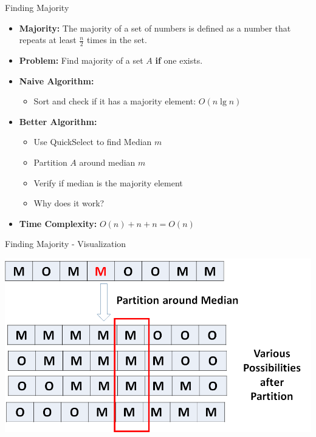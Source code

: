\documentclass{beamer}
\begin{document}
\begin{frame}{Finding Majority}
\begin{itemize}
    \item {\bf Majority:} The majority of a set of numbers is defined as a number that repeats at least $\frac{n}{2}$ times in the set.
    \item {\bf Problem:} Find majority of a set $A$ {\bf if} one exists.
    \item {\bf Naive Algorithm:} \pause 
        \begin{itemize}
            \item Sort and check if it has a majority element: $O(n \lg n)$
        \end{itemize}
    \item {\bf Better Algorithm:} \pause
    \begin{itemize}
        \item Use QuickSelect to find Median $m$
        \item Partition $A$ around median $m$
        \item Verify if median is the majority element
        \item Why does it work?
    \end{itemize}
    \item {\bf Time Complexity:} $O(n) + n + n = O(n)$
\end{itemize}
\end{frame}


\begin{frame}{Finding Majority - Visualization}
\begin{center}
    \includegraphics[scale=0.4]{findingMajorityVisualization.png}
\end{center}
\end{frame}
\end{document}
